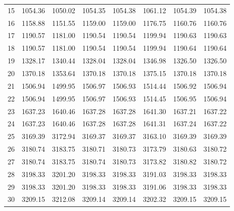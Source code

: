 \documentclass[10pt,oneside]{article}
\begin{document}
\begin{table}[h!]
\begin{tabular}{cccccccc}
15 &   1054.36 & 1050.02 & 1054.35 &    1054.38 &      1061.12 & 1054.39 &   1054.38 \\
16 &   1158.88 & 1151.55 & 1159.00 &    1159.00 &      1176.75 & 1160.76 &   1160.76 \\
17 &   1190.57 & 1181.00 & 1190.54 &    1190.54 &      1199.94 & 1190.63 &   1190.63 \\
18 &   1190.57 & 1181.00 & 1190.54 &    1190.54 &      1199.94 & 1190.64 &   1190.64 \\
19 &   1328.17 & 1340.44 & 1328.04 &    1328.04 &      1346.98 & 1326.50 &   1326.50 \\
20 &   1370.18 & 1353.64 & 1370.18 &    1370.18 &      1375.15 & 1370.18 &   1370.18 \\
21 &   1506.94 & 1499.95 & 1506.97 &    1506.93 &      1514.44 & 1506.92 &   1506.94 \\
22 &   1506.94 & 1499.95 & 1506.97 &    1506.93 &      1514.45 & 1506.95 &   1506.94 \\
23 &   1637.23 & 1640.46 & 1637.28 &    1637.28 &      1641.30 & 1637.21 &   1637.22 \\
24 &   1637.23 & 1640.46 & 1637.28 &    1637.28 &      1641.31 & 1637.24 &   1637.22 \\
25 &   3169.39 & 3172.94 & 3169.37 &    3169.37 &      3163.10 & 3169.39 &   3169.39 \\
26 &   3180.74 & 3183.75 & 3180.71 &    3180.73 &      3173.79 & 3180.63 &   3180.72 \\
27 &   3180.74 & 3183.75 & 3180.74 &    3180.73 &      3173.82 & 3180.82 &   3180.72 \\
28 &   3198.33 & 3201.20 & 3198.33 &    3198.33 &      3191.03 & 3198.33 &   3198.33 \\
29 &   3198.33 & 3201.20 & 3198.33 &    3198.33 &      3191.06 & 3198.33 &   3198.33 \\
30 &   3209.15 & 3212.08 & 3209.14 &    3209.14 &      3202.32 & 3209.15 &   3209.15 \\
\bottomrule
\end{tabular}
\end{table}
\end{document}
